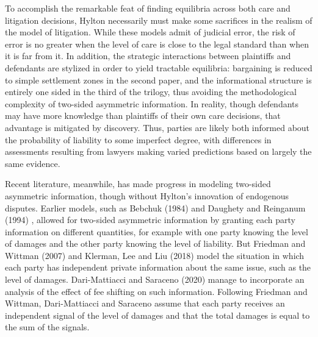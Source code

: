 \documentclass{article}
\begin{document}
To accomplish the remarkable feat of finding equilibria across both care and litigation decisions, Hylton necessarily must make some sacrifices in the realism of the model of litigation. While these models admit of judicial error, the risk of error is no greater when the level of care is close to the legal standard than when it is far from it. In addition, the strategic interactions between plaintiffs and defendants are stylized in order to yield tractable equilibria: bargaining is reduced to simple settlement zones in the second paper, and the informational structure is entirely one sided in the third of the trilogy, thus avoiding the methodological complexity of two-sided asymmetric information. In reality, though defendants may have more knowledge than plaintiffs of their own care decisions, that advantage is mitigated by discovery. Thus, parties are likely both informed about the probability of liability to some imperfect degree, with differences in assessments resulting from lawyers making varied predictions based on largely the same evidence.

Recent literature, meanwhile, has made progress in modeling two-sided asymmetric information, though without Hylton's innovation of endogenous disputes. Earlier models, such as Bebchuk (1984) \cite{bebchuk84} and Daughety and Reinganum (1994) \cite{daughetyreinganum1994}, allowed for two-sided asymmetric information by granting each party information on different quantities, for example with one party knowing the level of damages and the other party knowing the level of liability. But Friedman and Wittman (2007) \cite{friedmanwittman} and Klerman, Lee and Liu (2018) \cite{klermanleeliu} model the situation in which each party has independent private information about the same issue, such as the level of damages. Dari-Mattiacci and Saraceno (2020) \cite{darimatiaccisaraceno} manage to incorporate an analysis of the effect of fee shifting on such information. Following Friedman and Wittman, Dari-Mattiacci and Saraceno assume that each party receives an independent signal of the level of damages and that the total damages is equal to the sum of the signals.
\end{document}
